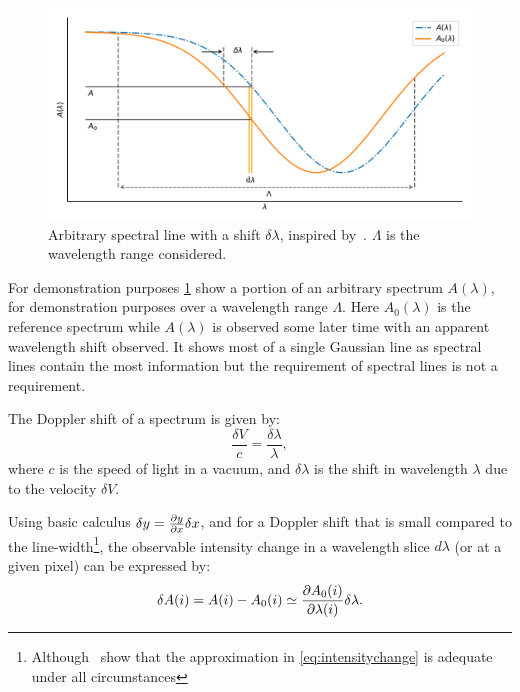 \begin{figure}
    \centering
    \includegraphics[width=0.7\linewidth]{figures/information-content/precision_plot.pdf}
    \caption{Arbitrary spectral line with a shift \(\delta \lambda\), inspired by~\citet{connes_absolute_1985}.  \(\Lambda\) is the wavelength range considered.}
    \label{fig:precisionderivation}
\end{figure}

For demonstration purposes  \cref{fig:precisionderivation} show a portion of an arbitrary spectrum \(A(\lambda)\), for demonstration purposes over a wavelength range \(\Lambda\).
Here \(A_0(\lambda)\) is the reference spectrum while \(A(\lambda)\) is observed some later time with an apparent wavelength shift observed.
It shows most of a single Gaussian line as spectral lines contain the most information but the requirement of spectral lines is not a requirement.

The Doppler shift of a spectrum is given by:
\begin{equation}
\frac{\delta V}{c} = \frac{\delta \lambda}{\lambda},
\label{eq:dopplershift}
\end{equation}
where \(c\) is the speed of light in a vacuum, and \(\delta \lambda\) is the shift in wavelength \(\lambda\) due to the velocity \(\delta V\).


Using basic calculus \(\delta y = \frac{\partial{y}}{\partial{x}} \delta x \nonumber\), and for a Doppler shift that is small compared to the line-width\footnote{Although~\citet{connes_absolute_1985} show that the approximation in \cref{eq:intensitychange} is adequate under all circumstances}, the observable intensity change in a wavelength slice \(d \lambda\) (or at a given pixel) can be expressed by:
\begin{equation}
\delta A(i) = A(i) - A_0(i) \simeq \frac{\partial{A_0(i)}}{\partial{\lambda(i)}} \delta \lambda.
\label{eq:intensitychange}
\end{equation}

